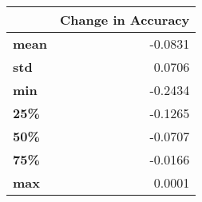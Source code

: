 \begin{tabular}{lr}
\toprule
{} &  Change in Accuracy \\
\midrule
\textbf{mean} &             -0.0831 \\
\textbf{std } &              0.0706 \\
\textbf{min } &             -0.2434 \\
\textbf{25\% } &             -0.1265 \\
\textbf{50\% } &             -0.0707 \\
\textbf{75\% } &             -0.0166 \\
\textbf{max } &              0.0001 \\
\bottomrule
\end{tabular}
